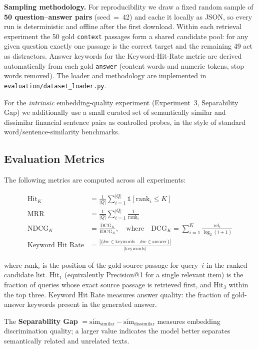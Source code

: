 \documentclass[12pt,a4paper]{article}
\begin{document}
\textbf{Sampling methodology.} For reproducibility we draw a fixed random sample of \textbf{50 question--answer pairs} (seed~=~42) and cache it locally as JSON, so every run is deterministic and offline after the first download. Within each retrieval experiment the 50 gold \texttt{context} passages form a shared candidate pool: for any given question exactly one passage is the correct target and the remaining 49 act as distractors. Answer keywords for the Keyword-Hit-Rate metric are derived automatically from each gold \texttt{answer} (content words and numeric tokens, stop words removed). The loader and methodology are implemented in \texttt{evaluation/dataset\_loader.py}.

For the \textit{intrinsic} embedding-quality experiment (Experiment~3, Separability Gap) we additionally use a small curated set of semantically similar and dissimilar financial sentence pairs as controlled probes, in the style of standard word/sentence-similarity benchmarks.

\subsection{Evaluation Metrics}

The following metrics are computed across all experiments:

\begin{align}
  \text{Hit}_K &= \frac{1}{|Q|}\sum_{i=1}^{|Q|}
      \mathbb{1}\!\left[\text{rank}_i \le K\right]
  \\[4pt]
  \text{MRR} &= \frac{1}{|Q|} \sum_{i=1}^{|Q|} \frac{1}{\text{rank}_i}
  \\[4pt]
  \text{NDCG}_K &= \frac{\text{DCG}_K}{\text{IDCG}_K},
    \quad \text{where} \quad
    \text{DCG}_K = \sum_{i=1}^{K} \frac{\text{rel}_i}{\log_2(i+1)}
  \\[4pt]
  \text{Keyword Hit Rate} &=
    \frac{|\{kw \in \text{keywords} \;:\; kw \in \text{answer}\}|}{|\text{keywords}|}
\end{align}

where $\text{rank}_i$ is the position of the gold source passage for query~$i$ in the ranked candidate list. $\text{Hit}_1$ (equivalently Precision@1 for a single relevant item) is the fraction of queries whose exact source passage is retrieved first, and $\text{Hit}_3$ within the top three. Keyword Hit Rate measures answer quality: the fraction of gold-answer keywords present in the generated answer.

The \textbf{Separability Gap} $= \overline{\text{sim}}_{\text{similar}} - \overline{\text{sim}}_{\text{dissimilar}}$ measures embedding discrimination quality; a larger value indicates the model better separates semantically related and unrelated texts.
\end{document}
